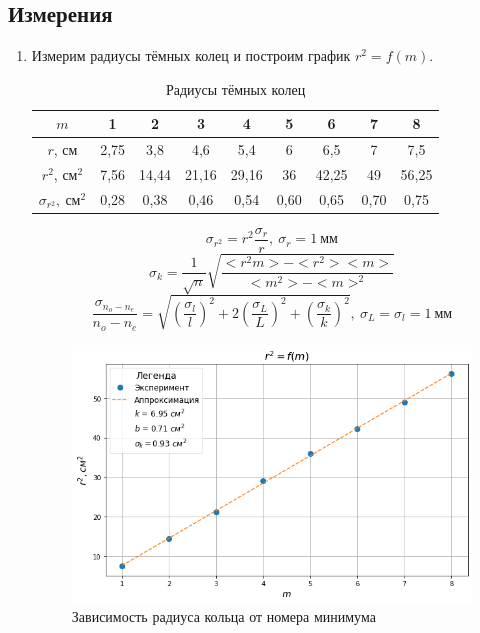 \documentclass[a4paper, 12pt]{article}
\begin{document}
\subsection{Измерения}

\begin{enumerate}
	\item Измерим радиусы тёмных колец и построим график $r^2 = f(m)$.

\clearpage
	\begin{table}[h!]
		\centering
		\begin{tabular}{|c|c|c|c|c|c|c|c|c|}
			\hline
			$m$                                           & 1      & 2     & 3     & 4     & 5  & 6     & 7  & 8     \\ \hline
			$r$, см                                       & 2,75   & 3,8   & 4,6   & 5,4   & 6  & 6,5   & 7  & 7,5   \\ \hline
			$r^2$, $см^2$ & 7,56 & 14,44 & 21,16 & 29,16 & 36 & 42,25 & 49 & 56,25 \\ \hline
			$\sigma_{r^2},~см^2$&0,28 &0,38 &0,46 &0,54 &0,60 &0,65 &0,70 &0,75 \\ \hline
		\end{tabular}
		\caption{Радиусы тёмных колец}
	\end{table}

\[\sigma_{r^2} = r^2\dfrac{\sigma_r}{r},~\sigma_r=1~{мм}\]
\[\sigma_k = \dfrac{1}{\sqrt{n}}\sqrt{\dfrac{<r^2m> - <r^2><m>}{<m^2> - <m>^2}}\]
\[\dfrac{\sigma_{n_o-n_e}}{n_o-n_e} = \sqrt{\left(\dfrac{\sigma_l}{l}\right)^2+2\left(\dfrac{\sigma_L}{L}\right)^2+\left(\dfrac{\sigma_k}{k}\right)^2}, ~\sigma_L=\sigma_l=1~{мм}\]


\begin{figure}[h!]
	\centering
	\includegraphics[width=1\textwidth]{graph1.png}
	\caption{Зависимость радиуса кольца от номера минимума}
	\label{Graph1}
\end{figure}


\end{enumerate}
\end{document}
